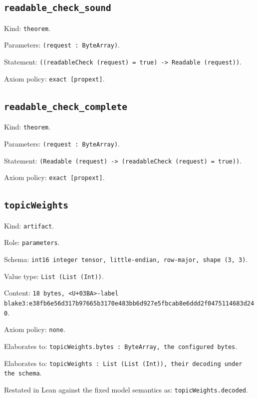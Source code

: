 \documentclass[11pt]{article}
\begin{document}
\subsection*{\texttt{readable\_check\_sound}}
\noindent Kind: \texttt{theorem}.\par
\noindent Parameters: \texttt{(request : ByteArray)}.\par
\noindent Statement: \texttt{((readableCheck (request) = true) -> Readable (request))}.\par
\noindent Axiom policy: \texttt{exact [propext]}.\par
\subsection*{\texttt{readable\_check\_complete}}
\noindent Kind: \texttt{theorem}.\par
\noindent Parameters: \texttt{(request : ByteArray)}.\par
\noindent Statement: \texttt{(Readable (request) -> (readableCheck (request) = true))}.\par
\noindent Axiom policy: \texttt{exact [propext]}.\par
\subsection*{\texttt{topicWeights}}
\noindent Kind: \texttt{artifact}.\par
\noindent Role: \texttt{parameters}.\par
\noindent Schema: \texttt{int16 integer tensor, little-endian, row-major, shape (3, 3)}.\par
\noindent Value type: \texttt{List (List (Int))}.\par
\noindent Content: \texttt{18 bytes, <U+03BA>-label blake3:e38fb6e56d317b97665b3170e483bb6d927e5fbcab8e6ddd2f0475114683d240}.\par
\noindent Axiom policy: \texttt{none}.\par
\noindent Elaborates to: \texttt{topicWeights.bytes : ByteArray, the configured bytes}.\par
\noindent Elaborates to: \texttt{topicWeights : List (List (Int)), their decoding under the schema}.\par
\noindent Restated in Lean against the fixed model semantics as: \texttt{topicWeights.decoded}.\par
\end{document}
